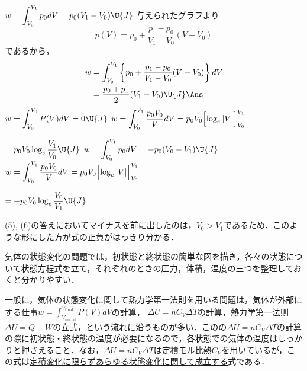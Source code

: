 \begin{multicols}{2}
\begin{bekkai}
\begin{komon}
 $w=\displaystyle\int_{V_0}^{V_1}p_0dV=p_0(V_1-V_0)\U{J}$\Ans
{} 与えられたグラフより
       \[p(V)=p_0+\frac{p_1-p_0}{V_1-V_0}(V-V_0)\]
       であるから，
       \[\begin{aligned}
         w&=\int_{V_0}^{V_1}\left\{p_0+\frac{p_1-p_0}{V_1-V_0}(V-V_0)\right\}dV\\
          &=\frac{p_0+p_1}{2}(V_1-V_0)\U{J}\Ans
       \end{aligned}\]
 $w=\displaystyle\int_{V_0}^{V_0}P(V)dV=0\U{J}$\Ans
{} $w=\displaystyle\int_{V_0}^{V_1}\frac{p_0V_0}{V}dV=p_0V_0\Bigl[\log_e|V|\Bigr]_{V_0}^{V_1}$\par
       \hspace*{1zw}$=p_0V_0\log_e\dfrac{V_1}{V_0}\U{J}$\Ans
{} $w=\displaystyle\int_{V_0}^{V_1}p_0dV=-p_0(V_0-V_1)\U{J}$\Ans
{} $w=\displaystyle\int_{V_0}^{V_1}\frac{p_0V_0}{V}dV=p_0V_0\Bigl[\log_e|V|\Bigr]_{V_0}^{V_1}$\par
       \hspace*{1zw}$=-p_0V_0\log_e\dfrac{V_0}{V_1}\U{J}$\Ans
\end{komon}
\end{bekkai}
\begin{chuu}
(5), (6)の答えにおいてマイナスを前に出したのは，$V_0>V_1$であるため．このような形にした方が式の正負がはっきり分かる．
\end{chuu}

\par\nopagebreak
\begin{sisin}
気体の状態変化の問題では，初状態と終状態の簡単な図を描き，各々の状態について状態方程式を立て，それぞれのときの圧力，体積，温度の三つを整理しておくと分かりやすい．

一般に，気体の状態変化に関して熱力学第一法則を用いる問題は，気体が外部にする仕事$w=\displaystyle\int_{V_{\mathrm{initial}}}^{V_{\mathrm{final}}}P(V)dV$の計算， $\Delta U=nC_V\Delta T$の計算，熱力学第一法則$\Delta U=Q+W$の立式，という流れに沿うものが多い．このの$\Delta U=nC_V\Delta T$の計算の際に初状態・終状態の温度が必要になるので，各状態での気体の温度はしっかりと押さえること．なお，$\Delta U=nC_V\Delta T$は定積モル比熱$C_V$を用いているが，この式は\underline{定積変化}\hskip0pt\underline{に限らず}\hskip0pt\underline{あらゆる}\hskip0pt\underline{状態変化}\hskip0pt\underline{に関して}\hskip0pt\underline{成立する}式である．


\end{sisin}
\end{multicols}
